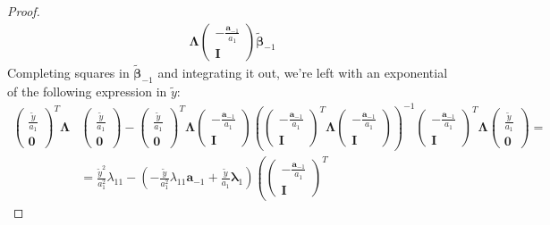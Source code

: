 \documentclass[10pt,fleqn]{amsart}
\theoremstyle{definition}
\theoremstyle{remark}
\numberwithin{equation}{section}
\newcommand{\aaa}{\boldsymbol{a}}
\newcommand{\bbeta}{\boldsymbol{\beta}}
\newcommand{\llambda}{\boldsymbol{\lambda}}
\newcommand{\LLambda}{\boldsymbol{\Lambda}}
\newcommand{\bbetatilde}{\widetilde{\bbeta}}
\newcommand{\ytilde}{\widetilde{y}}
\begin{document}
\begin{proof}
\begin{equation*}
\begin{split}
    \LLambda\left(\begin{matrix}-\frac {\aaa_{-1}}{a_1}\\\boldsymbol{I}\end{matrix}\right)\bbetatilde_{-1}
\end{split}\end{equation*}
Completing squares in $\bbetatilde_{-1}$ and integrating it out, we're left with an exponential of the following expression in $\ytilde$:
\begin{equation}\label{appendix_gauss_conv_eq}\begin{split}
    \left(\begin{matrix}\frac \ytilde{a_1}\\\boldsymbol{0}\end{matrix}\right)^T
    \LLambda&
    \left(\begin{matrix}\frac \ytilde{a_1}\\\boldsymbol{0}\end{matrix}\right)-
    \left(\begin{matrix}\frac \ytilde{a_1}\\\boldsymbol{0}\end{matrix}\right)^T
    \LLambda
    \left(\begin{matrix}-\frac {\aaa_{-1}}{a_1}\\\boldsymbol{I}\end{matrix}\right)
    \left(
        \left(\begin{matrix}-\frac {\aaa_{-1}}{a_1}\\\boldsymbol{I}\end{matrix}\right)^T
        \LLambda
        \left(\begin{matrix}-\frac {\aaa_{-1}}{a_1}\\\boldsymbol{I}\end{matrix}\right)
    \right)^{-1}
    \left(\begin{matrix}-\frac {\aaa_{-1}}{a_1}\\\boldsymbol{I}\end{matrix}\right)^T
    \LLambda
    \left(\begin{matrix}\frac \ytilde{a_1}\\\boldsymbol{0}\end{matrix}\right)=\\
    &=\frac{\ytilde^2}{a_1^2}\lambda_{11}-\left(-\frac{\ytilde}{a_1^2}\lambda_{11}\aaa_{-1}+\frac{\ytilde}{a_1}\llambda_1\right)
    \left(
        \left(\begin{matrix}-\frac {\aaa_{-1}}{a_1}\\\boldsymbol{I}\end{matrix}\right)^T

\end{split}
\end{equation}
\end{proof}
\end{document}
